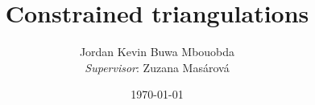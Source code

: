 \documentclass[10pt]{beamer}
\begin{document}
	\author{\begin{center}
			Jordan Kevin Buwa Mbouobda \\
			{\small{\textit{Supervisor}}}: Zuzana Mas\'arov\'a	\end{center} }
	\title{Constrained triangulations}
	\date{\today}
	\begin{frame}[plain]	
		\maketitle
	\end{frame}
	
\end{document}
